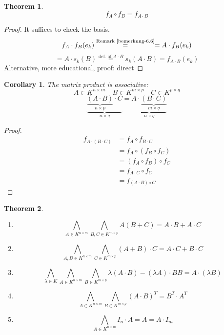 \documentclass[a4paper,landscape,twocolumn]{article}
\newtheorem{theorem}{Theorem}[section]
\newtheorem{cor}{Corollary}[section]
\begin{document}
\begin{theorem}
  \label{satz-6.8}
  \[ f_A \circ f_B = f_{A \cdot B} \]
\end{theorem}
\begin{proof}
  It suffices to check the basis.
  \[
    f_A \cdot f_B(e_k) \overset{\text{Remark~\ref{bemerkung-6.6}}}{=}
    = A \cdot f_B(e_k)
  \] \[
    = A \cdot s_k(B) \overset{\text{def. of } A \cdot B}{=} s_k(A \cdot B) = f_{A \cdot B}(e_k)
  \]
  Alternative, more educational, proof: direct
\end{proof}
\begin{cor}
  The matrix product is associative:
  \[ A \in K^{n\times m} \quad B \in K^{m\times p} \quad C \in K^{p\times q} \]
  \[
    \underbrace{\underbrace{(A \cdot B)}_{n\times p} \cdot C}_{n\times q}
    = \underbrace{A \cdot \underbrace{(B \cdot C)}_{m\times q}}_{n\times q}
  \]
\end{cor}
\begin{proof}
  \begin{align*}
      f_{A \cdot (B \cdot C)}
        &= f_A \circ f_{B \cdot C} \\
        &= f_A \circ (f_B \circ f_C) \\
        &= (f_A \circ f_B) \circ f_C \\
        &= f_{A \cdot C} \circ f_C \\
        &= f_{(A\cdot B) \circ C}
  \end{align*}
\end{proof}
\begin{theorem}
  \label{satz-6.10}
  \begin{enumerate}
    \item \[ \bigwedge_{A \in K^{n\times m}} \bigwedge_{B,C \in K^{m\times p}} A(B + C) = A \cdot B + A \cdot C \]
    \item \[ \bigwedge_{A,B \in K^{n\times m}} \bigwedge_{C \in K^{m\times p}} (A + B) \cdot C = A \cdot C + B \cdot C \]
    \item \[ \bigwedge_{\lambda \in K} \bigwedge_{A \in K^{n\times m}} \bigwedge_{B \in K^{m\times p}} \lambda (A \cdot B) - (\lambda A)\cdot B B = A \cdot (\lambda B) \]
    \item \[ \bigwedge_{A \in K^{n\times m}} \bigwedge_{B \in K^{m\times p}} (A \cdot B)^T = B^T \cdot A^T \]
    \item \[ \bigwedge_{A \in K^{n\times m}} I_n \cdot A = A = A \cdot I_m \]
  \end{enumerate}
\end{theorem}
\end{document}
